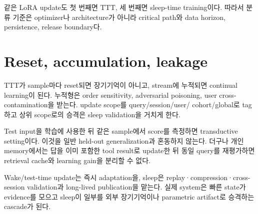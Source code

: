 같은 LoRA update도 첫 번째면 TTT, 세 번째면 sleep-time training이다. 따라서 분류 기준은 optimizer나
architecture가 아니라 critical path와 data horizon, persistence, release boundary다.

\section{Reset, accumulation, leakage}

TTT가 sample마다 reset되면 장기기억이 아니고, stream에 누적되면 continual learning이 된다. 누적형은
order sensitivity, adversarial poisoning, user cross-contamination을 받는다. update scope를 query/session/user/
cohort/global로 tag하고 상위 scope로의 승격은 sleep validation을 거치게 한다.

Test input을 학습에 사용한 뒤 같은 sample에서 score를 측정하면 transductive setting이다. 이것을 일반
held-out generalization과 혼동하지 않는다. 더구나 개인 memory에서는 답을 이미 포함한 tool result로
update한 뒤 동일 query를 재평가하면 retrieval cache와 learning gain을 분리할 수 없다.

\begin{keypoint}
Wake/test-time update는 즉시 adaptation을, sleep은 replay·compression·cross-session validation과
long-lived publication을 맡는다. 실제 system은 빠른 state가 evidence를 모으고 sleep이 일부를 외부
장기기억이나 parametric artifact로 승격하는 cascade가 된다.
\end{keypoint}
